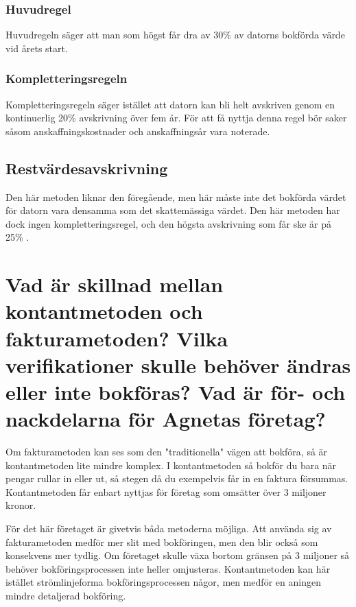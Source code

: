 \documentclass[a4paper, titlepage,12pt]{article}
\begin{document}
		\subsubsection{Huvudregel}
			Huvudregeln säger att man som högst får dra av 30\% av datorns bokförda värde vid årets start.
		\subsubsection{Kompletteringsregeln}
			Kompletteringsregeln säger istället att datorn kan bli helt avskriven genom en kontinuerlig 20\% avskrivning över fem år. För att få nyttja denna regel bör saker såsom anskaffningskostnader och anskaffningsår vara noterade.

		\subsection{Restvärdesavskrivning}
			Den här metoden liknar den föregående, men här måste inte det bokförda värdet för datorn vara densamma som det skattemässiga värdet. Den här metoden har dock ingen kompletteringsregel, och den högsta avskrivning som får ske är på 25\% \cite{skatteverket}.
	\section{Vad är skillnad mellan kontantmetoden och fakturametoden? Vilka verifikationer skulle behöver ändras eller inte bokföras? Vad är för- och nackdelarna för Agnetas företag?}
		Om fakturametoden kan ses som den "traditionella" vägen att bokföra, så är kontantmetoden lite mindre komplex. I kontantmetoden så bokför du bara när pengar rullar in eller ut, så stegen då du exempelvis får in en faktura försummas. Kontantmetoden får enbart nyttjas för företag som omsätter över 3 miljoner kronor\cite{speedledger}.

		För det här företaget är givetvis båda metoderna möjliga. Att använda sig av fakturametoden medför mer slit med bokföringen, men den blir också som konsekvens mer tydlig. Om företaget skulle växa bortom gränsen på 3 miljoner så behöver bokföringsprocessen inte heller omjusteras. Kontantmetoden kan här istället strömlinjeforma bokföringsprocessen någor, men medför en aningen mindre detaljerad bokföring.

		\printbibliography
\end{document}
